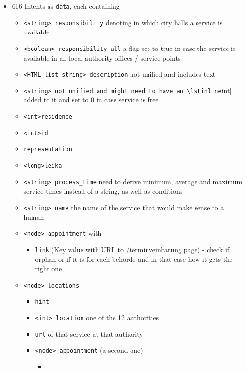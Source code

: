 \begin{itemize}
	\item 616 Intents as \lstinline|data|, each containing
	\begin{itemize}
		\item \lstinline|<string> responsibility| denoting in which city halls a service is available
		\item \lstinline|<boolean> responsibility_all| a flag set to true in case the service is available in all local authority offices / service points
		\item \lstinline|<HTML list string> description| not unified and includes text
		\item  \lstinline|<string> not unified and might need to have an \lstinline|int| added to it and set to 0 in case service is free
		\item \lstinline|<int>residence|
		\item \lstinline|<int>id|
		\item \lstinline|representation|
		\item \lstinline|<long>leika|
		\item \lstinline|<string> process_time| need to derive minimum, average and maximum service times instead of a string, as well as conditions 
		\item \lstinline|<string> name| the name of the service that would make sense to a human
		\item \lstinline|<node> appointment| with 
		\begin{itemize}
			\item \lstinline|link| (Key value with URL to /terminveinbarung page) - check if orphan or if it is for each beh\"orde and in that case how it gets the right one
		\end{itemize}	 
		\item \lstinline|<node> locations| 
		\begin{itemize}
			\item \lstinline|hint|
			\item \lstinline|<int> location| one of the 12 authorities
			\item \lstinline|url| of that service at that authority
			\item \lstinline|<node> appointment| (a second one)
			\begin{itemize}
				\item 
			\end{itemize}
		\end{itemize}
		

\end{itemize}
\end{itemize}
